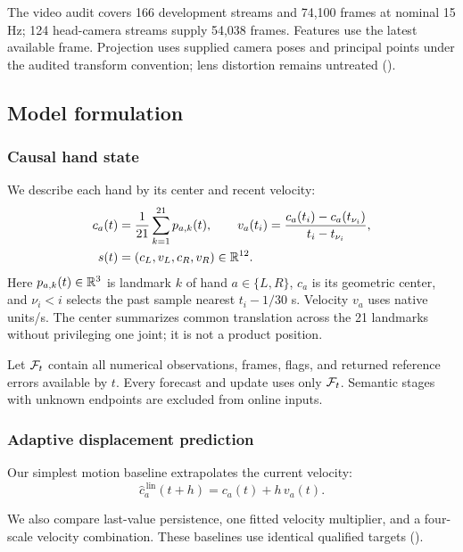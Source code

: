 The video audit covers 166 development streams and 74,100 frames at nominal 15 Hz; 124 head-camera streams supply 54,038 frames. Features use the latest available frame. Projection uses supplied camera poses and principal points under the audited transform convention; lens distortion remains untreated ().
\FloatBarrier

\subsection{Model formulation}
\subsubsection{Causal hand state}
We describe each hand by its center and recent velocity:
\begin{equation}
\begin{aligned}
c_a(t)&=\frac{1}{21}\sum_{k=1}^{21}p_{a,k}(t),\qquad
v_a(t_i)=\frac{c_a(t_i)-c_a(t_{\nu_i})}{t_i-t_{\nu_i}},\\
s(t)&=(c_L,v_L,c_R,v_R)\in\mathbb{R}^{12}.
\end{aligned}
\label{eq:state}
\end{equation}
\noindent Here $p_{a,k}(t)\in\mathbb{R}^3$ is landmark $k$ of hand $a\in\{L,R\}$, $c_a$ is its geometric center, and $\nu_i<i$ selects the past sample nearest $t_i-1/30$ s. Velocity $v_a$ uses native units/s. The center summarizes common translation across the 21 landmarks without privileging one joint; it is not a product position.

Let $\mathcal{F}_t$ contain all numerical observations, frames, flags, and returned reference errors available by $t$. Every forecast and update uses only $\mathcal{F}_t$. Semantic stages with unknown endpoints are excluded from online inputs.

\subsubsection{Adaptive displacement prediction}
Our simplest motion baseline extrapolates the current velocity:
\begin{equation}
\widehat c_a^{\,\mathrm{lin}}(t+h)=c_a(t)+h\,v_a(t).
\label{eq:linear}
\end{equation}

We also compare last-value persistence, one fitted velocity multiplier, and a four-scale velocity combination. These baselines use identical qualified targets ().

